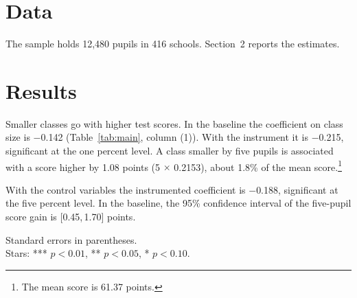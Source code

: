 \documentclass{article}
\begin{document}
\section{Data}

The sample holds 12,480 pupils in 416 schools. Section~2 reports the estimates.

\section{Results}

Smaller classes go with higher test scores. In the baseline the coefficient on class size is $-$0.142 (Table~\ref{tab:main}, column (1)). With the instrument it is $-$0.215, significant at the one percent level. A class smaller by five pupils is associated with a score higher by 1.08 points (5 $\times$ 0.2153), about 1.8\% of the mean score.\footnote{The mean score is 61.37 points.}

With the control variables the instrumented coefficient is $-$0.188, significant at the five percent level. In the baseline, the 95\% confidence interval of the five-pupil score gain is [0.45,\,1.70] points.

\begin{table}[h]
\centering
\caption{Class size and test scores}\label{tab:main}

\par\footnotesize Standard errors in parentheses.\\%
Stars: *** $p<0.01$, ** $p<0.05$, * $p<0.10$.
\end{table}
\end{document}
